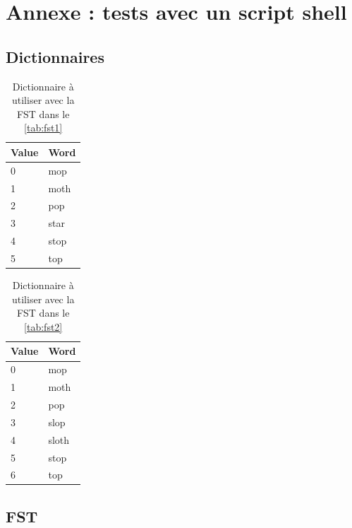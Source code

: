 \newpage
\appendix
\section{Annexe : tests avec un script shell}
\label{sec:annexe:shell}

\subsection{Dictionnaires}

\begin{table}[h]
    \centering
    \begin{tabular}{|l|l|}
        \hline
        Value & Word \\
        \hline
        0 & mop \\
        1 & moth \\
        2 & pop \\
        3 & star \\
        4 & stop \\
        5 & top \\
        \hline
    \end{tabular}
    \caption{Dictionnaire à utiliser avec la FST dans le \autoref{tab:fst1}}
    \label{tab:dico1}
\end{table}

\begin{table}[h]
    \centering
    \begin{tabular}{|l|l|}
        \hline
        Value & Word \\
        \hline
        0 & mop \\
        1 & moth \\
        2 & pop \\
        3 & slop \\
        4 & sloth \\
        5 & stop \\
        6 & top \\
        \hline
    \end{tabular}
    \caption{Dictionnaire à utiliser avec la FST dans le \autoref{tab:fst2}}
    \label{tab:dico2}
\end{table}

\clearpage
\subsection{FST}

